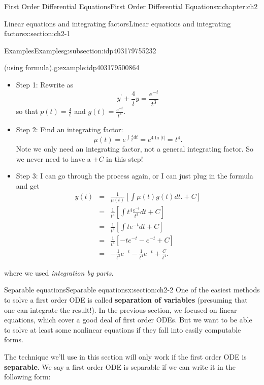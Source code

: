 \documentclass[oneside,10pt,]{book}
\newcommand{\terminology}[1]{\textbf{#1}}
\numberwithin{equation}{section}
\numberwithin{equation}{section}
\newcommand{\amp}{&}
\begin{document}
\begin{chapterptx}{First Order Differential Equations}{}{First Order Differential Equations}{}{}{x:chapter:ch2}
\begin{sectionptx}{Linear equations and integrating factors}{}{Linear equations and integrating factors}{}{}{x:section:ch2-1}
\begin{subsectionptx}{Examples}{}{Examples}{}{}{g:subsection:idp403179755232}
\begin{example}{(using formula).}{g:example:idp403179500864}
%
%
\begin{itemize}[label=\textbullet]
\item{}Step 1: Rewrite as%
\begin{equation*}
y^{\prime}+\frac{4}{t}y=\frac{e^{-t}}{t^{3}}
\end{equation*}
so that \(p(t)=\frac{4}{t}\) and \(g(t)=\frac{e^{-t}}{t^{3}}\).%
\item{}Step 2: Find an integrating factor:%
\begin{equation*}
\mu(t)=e^{\int\frac{4}{t}dt}=e^{4\ln\left|t\right|}=t^{4}.
\end{equation*}
Note we only need an integrating factor, not a general integrating factor. So we never need to have a \(+C\) in this step!%
\item{}Step 3: I can go through the process again, or I can just plug in the formula and get%
\begin{align*}
y(t) \amp = \amp \frac{1}{\mu(t)}\left[\int\mu(t)g(t)dt.+C\right]\\
\amp = \amp \frac{1}{t^{4}}\left[\int t^{4}\frac{e^{-t}}{t^{3}}dt+C\right]\\
\amp = \amp \frac{1}{t^{4}}\left[\int te^{-t}dt+C\right]\\
\amp = \amp \frac{1}{t^{4}}\left[-te^{-t}-e^{-t}+C\right]\\
\amp = \amp -\frac{1}{t^{3}}e^{-t}-\frac{1}{t^{4}}e^{-t}+\frac{C}{t^{4}}.
\end{align*}
%
\end{itemize}
 where we used \emph{integration by parts}.\end{example}
\end{subsectionptx}
\end{sectionptx}
%
%
\typeout{************************************************}
\typeout{************************************************}
%
\begin{sectionptx}{Separable equations}{}{Separable equations}{}{}{x:section:ch2-2}
One of the easiest methods to solve a first order ODE is called \terminology{separation of variables} (presuming that one can integrate the result!). In the previous section, we focused on linear equations, which cover a good deal of first order ODEs. But we want to be able to solve at least some nonlinear equations if they fall into easily computable forms.%
\par
The technique we'll use in this section will only work if the first order ODE is \terminology{separable}. We say a first order ODE is separable if we can write it in the following form:%

\end{sectionptx}
\end{chapterptx}
\end{document}

